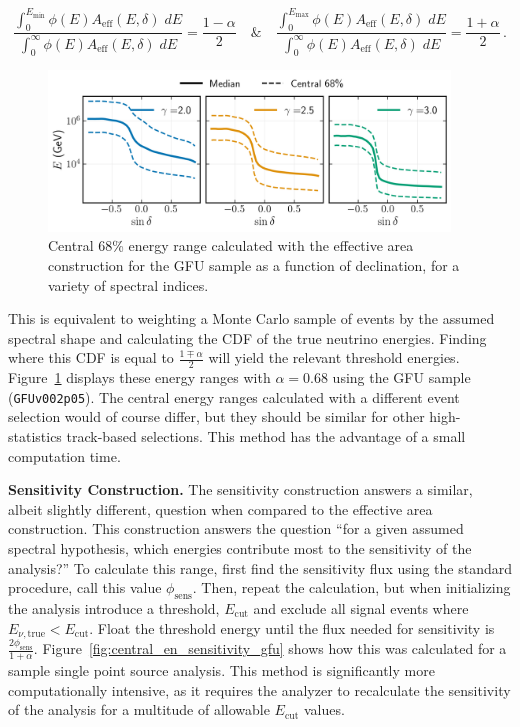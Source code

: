 \documentclass[a4paper,11pt]{article}
\begin{document}
\begin{equation}
    \frac{\displaystyle\int_{0}^{E_{\mathrm{min}}}\phi(E) A_{\mathrm{eff}}(E, \delta)\; dE}{\displaystyle\int_{0}^{\infty}\phi(E) A_{\mathrm{eff}}(E, \delta)\; dE}  = \frac{1-\alpha}{2} \quad \& \quad \frac{\displaystyle\int_{0}^{E_{\mathrm{max}}}\phi(E) A_{\mathrm{eff}}(E, \delta)\; dE}{\displaystyle\int_{0}^{\infty}\phi(E) A_{\mathrm{eff}}(E, \delta)\; dE}  = \frac{1+\alpha}{2} \, .
\end{equation}

\begin{figure}
    \centering
    \includegraphics[width=0.95\textwidth]{figures/gfu_central_energies_effective_area.png}
    \caption{Central 68\% energy range calculated with the effective area construction for the GFU sample as a function of declination, for a variety of spectral indices.}
    \label{fig:central_en_eff_area_gfu}
\end{figure}

This is equivalent to weighting a Monte Carlo sample of events by the assumed spectral shape and calculating the CDF of the true neutrino energies. Finding where this CDF is equal to $\frac{1\mp\alpha}{2}$ will yield the relevant threshold energies. Figure~\ref{fig:central_en_eff_area_gfu} displays these energy ranges with $\alpha=0.68$ using the GFU sample (\texttt{GFUv002p05}). The central energy ranges calculated with a different event selection would of course differ, but they should be similar for other high-statistics track-based selections. This method has the advantage of a small computation time. 

\textbf{Sensitivity Construction.} The sensitivity construction answers a similar, albeit slightly different, question when compared to the effective area construction. This construction answers the question ``for a given assumed spectral hypothesis, which energies contribute most to the sensitivity of the analysis?'' To calculate this range, first find the sensitivity flux using the standard procedure, call this value $\phi_{\mathrm{sens}}$. Then, repeat the calculation, but when initializing the analysis introduce a threshold, $E_{\mathrm{cut}}$ and exclude all signal events where $E_{\nu, \mathrm{true}} < E_{\mathrm{cut}}$. Float the threshold energy until the flux needed for sensitivity is $\frac{2\phi_{\mathrm{sens}}}{1+\alpha}$. Figure~\ref{fig:central_en_sensitivity_gfu} shows how this was calculated for a sample single point source analysis. This method is significantly more computationally intensive, as it requires the analyzer to recalculate the sensitivity of the analysis for a multitude of allowable $E_{\mathrm{cut}}$ values. 
\end{document}
